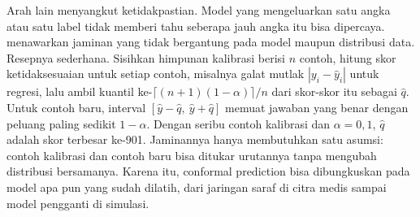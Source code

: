 Arah lain menyangkut ketidakpastian. Model yang mengeluarkan satu angka atau satu label tidak memberi tahu seberapa
jauh angka itu bisa dipercaya.  \citep{angelopoulos2021} menawarkan jaminan yang tidak
bergantung pada model maupun distribusi data. Resepnya sederhana. Sisihkan himpunan kalibrasi berisi $n$ contoh,
hitung skor ketidaksesuaian untuk setiap contoh, misalnya galat mutlak $|y_i-\hat y_i|$ untuk regresi, lalu ambil
kuantil ke-$\lceil(n+1)(1-\alpha)\rceil/n$ dari skor-skor itu sebagai $\hat q$. Untuk contoh baru, interval
$[\hat y-\hat q,\ \hat y+\hat q]$ memuat jawaban yang benar dengan peluang paling sedikit $1-\alpha$. Dengan seribu contoh
kalibrasi dan $\alpha=0{,}1$, $\hat q$ adalah skor terbesar ke-901. Jaminannya hanya membutuhkan satu asumsi: contoh
kalibrasi dan contoh baru bisa ditukar urutannya tanpa mengubah distribusi bersamanya. Karena itu, conformal prediction
bisa dibungkuskan pada model apa pun yang sudah dilatih, dari jaringan saraf di citra medis sampai model pengganti di
simulasi.


